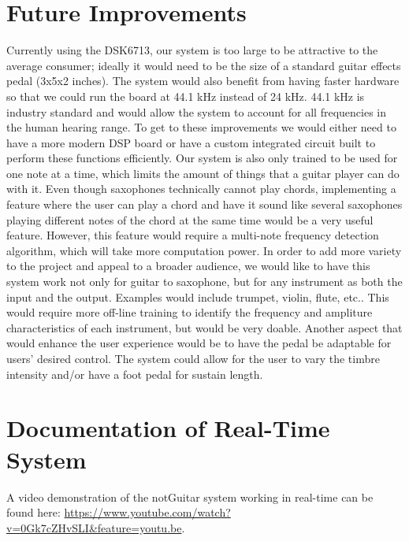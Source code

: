 \documentclass[12pt]{article}
\begin{document}
\section{Future Improvements}
Currently using the DSK6713, our system is too large to be attractive to the average consumer; ideally it would need to be the size of a standard guitar effects pedal (3x5x2 inches). The system would also benefit from having faster hardware so that we could run the board at 44.1 kHz instead of 24 kHz. 44.1 kHz is industry standard and would allow the system to account for all frequencies in the human hearing range. To get to these improvements we would either need to have a more modern DSP board or have a custom integrated circuit built to perform these functions efficiently.
\newline\newline
Our system is also only trained to be used for one note at a time, which limits the amount of things that a guitar player can do with it. Even though saxophones technically cannot play chords, implementing a feature where the user can play a chord and have it sound like several saxophones playing different notes of the chord at the same time would be a very useful feature. However, this feature would require a multi-note frequency detection algorithm, which will take more computation power.
\newline\newline
In order to add more variety to the project and appeal to a broader audience, we would like to have this system work not only for guitar to saxophone, but for any instrument as both the input and the output. Examples would include trumpet, violin, flute, etc.. This would require more off-line training to identify the frequency and ampliture characteristics of each instrument, but would be very doable. Another aspect that would enhance the user experience would be to have the pedal be adaptable for users' desired control. The system could allow for the user to vary the timbre intensity and/or have a foot pedal for sustain length.

\section{Documentation of Real-Time System}
A video demonstration of the notGuitar system working in real-time can be found here: \url{https://www.youtube.com/watch?v=0Gk7cZHvSLI&feature=youtu.be}.




\end{document}
